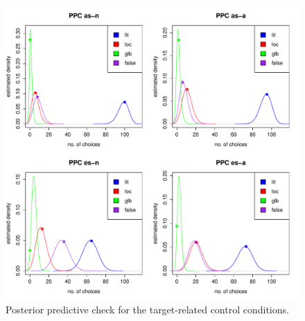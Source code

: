 \documentclass[fleqn,reqno,10pt]{article}
\begin{document}
\begin{figure}
  \centering
  \includegraphics[width=\textwidth]{pics/PPC_T.pdf}
  \caption{Posterior predictive check for the target-related control
    conditions.}
  \label{fig:Posterior_T}
\end{figure}

\printbibliography[heading=bibintoc]
\end{document}
